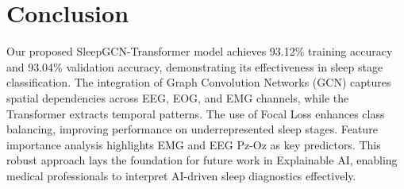 \section{Conclusion}
Our proposed SleepGCN-Transformer model achieves 93.12\% training accuracy and
93.04\% validation accuracy, demonstrating its effectiveness in sleep stage classification.
The integration of Graph Convolution Networks (GCN) captures spatial dependencies
across EEG, EOG, and EMG channels, while the Transformer extracts temporal patterns. The
use of Focal Loss enhances class balancing, improving performance on underrepresented sleep
stages. Feature importance analysis highlights EMG and EEG Pz-Oz as key predictors. This
robust approach lays the foundation for future work in Explainable AI, enabling medical
professionals to interpret AI-driven sleep diagnostics effectively.